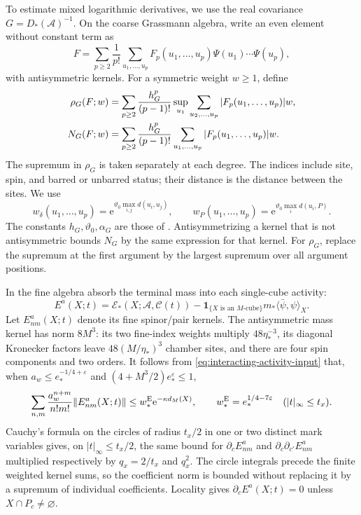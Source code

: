 To estimate mixed logarithmic derivatives, we use the
real covariance $G=D_*(\mathscr A)^{-1}$. On the
coarse Grassmann algebra, write an even element
without constant term as
\[
 F=\sum_{p\ge2}\frac1{p!}\sum_{u_1,\ldots,u_p}
 F_p(u_1,\ldots,u_p)\Psi(u_1)\cdots\Psi(u_p),
\]
with antisymmetric kernels.
For a symmetric weight $w\ge1$, define
\begin{align}
 \rho_G(F;w)&=\sum_{p\ge2}\frac{h_G^p}{(p-1)!}
       \sup_{u_1}\sum_{u_2,\ldots,u_p}|F_p(u_1,\ldots,u_p)|w,
                                                     \notag\\
 N_G(F;w)&=\sum_{p\ge2}\frac{h_G^p}{(p-1)!}
       \sum_{u_1,\ldots,u_p}|F_p(u_1,\ldots,u_p)|w .
                                     \label{eq:interacting-tree-norms}
\end{align}
The supremum in $\rho_G$ is taken separately
at each degree. The indices include site, spin,
and barred or unbarred status; their distance
is the distance between the sites. We use
\[
 w_\delta(u_1,\ldots,u_p)=
          \mathrm e^{\vartheta_0\max_{i,j}d(u_i,u_j)},\qquad
 w_P(u_1,\ldots,u_p)=\mathrm e^{\vartheta_0\max_i d(u_i,P)} .
\]
The constants $h_G,\vartheta_0,\alpha_G$ are
those of \cite[(74)]{TerminalPressure}.
Antisymmetrizing a kernel that is not antisymmetric
bounds $N_G$ by the same expression for that
kernel. For $\rho_G$, replace the supremum at
the first argument by the largest supremum
over all argument positions.

In the fine algebra absorb the terminal mass
into each single-cube activity:
\[
 E^a(X;t)=\mathscr E_*(X;\mathscr A,\mathscr C(t))
              -\mathbf1_{\{X\text{ is an }M\text{-cube}\}}
                         m_*\langle\bar\psi,\psi\rangle_X.
\]
Let $E^a_{nm}(X;t)$ denote its fine spinor/pair
kernels. The antisymmetric mass kernel has
norm $8M^3$: its two fine-index weights multiply
$48\eta_*^{-3}$, its diagonal Kronecker factors
leave $48(M/\eta_*)^3$ chamber sites, and there
are four spin components and two orders.
It follows from \eqref{eq:interacting-activity-input}
that, when $a_w\le e_*^{-1/4+\varepsilon}$ and
$(4+M^3/2)e_*^\varepsilon\le1$,
\begin{equation}\label{eq:interacting-absorbed-activity}
 \sum_{n,m}\frac{a_w^{n+m}}{n!m!}\|E^a_{nm}(X;t)\|
          \le w_*^{\rm E}\mathrm e^{-\kappa d_M(X)},\qquad
 w_*^{\rm E}=e_*^{1/4-7\varepsilon}
                                      \quad(|t|_\infty\le t_x).
\end{equation}
Cauchy's formula on the circles of radius $t_x/2$
in one or two distinct mark variables gives,
on $|t|_\infty\le t_x/2$, the same bound
for $\partial_cE^a_{nm}$ and
$\partial_c\partial_{c'}E^a_{nm}$ multiplied
respectively by $q_x=2/t_x$ and $q_x^2$.
The circle integrals precede the finite weighted
kernel sums, so the coefficient norm is bounded
without replacing it by a supremum of individual
coefficients. Locality gives
$\partial_cE^a(X;t)=0$ unless $X\cap P_c\ne\varnothing$.

